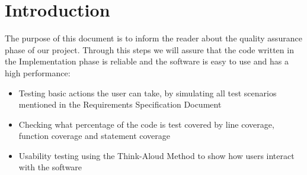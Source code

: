 \section{Introduction}
The purpose of this document is to inform the reader about the quality assurance phase of our project. Through this steps we will assure that the code written in the Implementation phase is reliable and the software is easy to use and has a high performance:
\begin{itemize}
    \item Testing basic actions the user can take, by simulating all test scenarios mentioned in the Requirements Specification Document 
    \item Checking what percentage of the code is test covered by line coverage, function coverage and statement coverage
    \item Usability testing using the Think-Aloud Method to show how users interact with the software
\end{itemize}